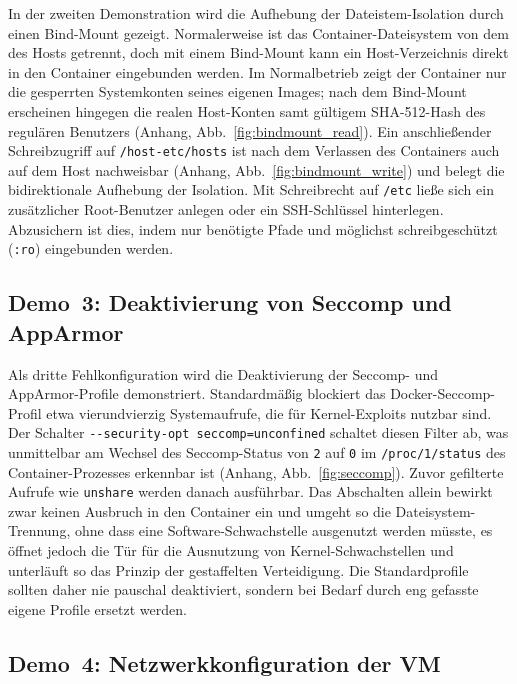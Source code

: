 \documentclass[conference]{IEEEtran}
\begin{document}
In der zweiten Demonstration wird die Aufhebung der Dateistem-Isolation durch einen Bind-Mount gezeigt. 
Normalerweise ist das Container-Dateisystem von dem des Hosts getrennt, 
doch mit einem Bind-Mount kann ein Host-Verzeichnis direkt in den Container eingebunden werden.
Im Normalbetrieb zeigt der Container nur die gesperrten Systemkonten seines eigenen Images;
nach dem Bind-Mount erscheinen hingegen die realen Host-Konten samt gültigem SHA-512-Hash 
des regulären Benutzers (Anhang, Abb.~\ref{fig:bindmount_read}). 
Ein anschließender Schreibzugriff auf \texttt{/host-etc/hosts} ist nach dem Verlassen des Containers 
auch auf dem Host nachweisbar (Anhang, Abb.~\ref{fig:bindmount_write})
und belegt die bidirektionale Aufhebung der Isolation. 
Mit Schreibrecht auf \texttt{/etc} ließe sich ein zusätzlicher Root-Benutzer anlegen oder ein SSH-Schlüssel hinterlegen.
Abzusichern ist dies, indem nur benötigte Pfade und möglichst schreibgeschützt (\texttt{:ro}) eingebunden werden.

\subsection{Demo~3: Deaktivierung von Seccomp und AppArmor}

Als dritte Fehlkonfiguration wird die Deaktivierung der Seccomp- und AppArmor-Profile demonstriert.
Standardmäßig blockiert das Docker-Seccomp-Profil etwa vierundvierzig Systemaufrufe, die für Kernel-Exploits nutzbar sind.
Der Schalter \texttt{-{}-security-opt seccomp=unconfined} schaltet diesen Filter ab, was unmittelbar am Wechsel 
des Seccomp-Status von \texttt{2} auf \texttt{0} im \texttt{/proc/1/status} des Container-Prozesses erkennbar ist (Anhang, Abb.~\ref{fig:seccomp}).
Zuvor gefilterte Aufrufe wie \texttt{unshare} werden danach ausführbar.
Das Abschalten allein bewirkt zwar keinen Ausbruch in den Container ein und umgeht so die Dateisystem-Trennung, 
ohne dass eine Software-Schwachstelle ausgenutzt werden müsste, es öffnet jedoch die Tür für die Ausnutzung 
von Kernel-Schwachstellen und unterläuft so das Prinzip der gestaffelten Verteidigung.
Die Standardprofile sollten daher nie pauschal deaktiviert, sondern bei Bedarf durch eng gefasste eigene Profile ersetzt werden.

\subsection{Demo~4: Netzwerkkonfiguration der VM}
\end{document}
